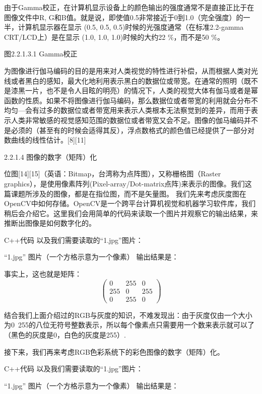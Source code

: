 	由于Gamma校正，在计算机显示设备上的颜色输出的强度通常不是直接正比于在图像文件中R, G和B值。就是说，即使值0.5非常接近于0到1.0（完全强度）的一半，计算机显示器在显示 (0.5, 0.5, 0.5)时候的光强度通常（在标准2.2-gamma CRT/LCD上）是在显示 (1.0, 1.0, 1.0)时候的大约22 \%，而不是50 \%。

图2.2.1.3.1 Gamma校正
	
	为图像进行伽马编码的目的是用来对人类视觉的特性进行补偿，从而根据人类对光线或者黑白的感知，最大化地利用表示黑白的数据位或带宽。在通常的照明（既不是漆黑一片，也不是令人目眩的明亮）的情况下，人类的视觉大体有伽马或者是幂函数的性质。如果不将图像进行伽马编码，那么数据位或者带宽的利用就会分布不均匀---会有过多的数据位或者带宽用来表示人类根本无法察觉到的差异，而用于表示人类非常敏感的视觉感知范围的数据位或者带宽又会不足。图像的伽马编码并不是必须的（甚至有的时候会适得其反），浮点数格式的颜色值已经提供了一部分对数曲线的线性估计。[8][11]

2.2.1.4 图像的数字（矩阵）化

	位图[14][15]（英语：Bitmap，台湾称为点阵图），又称栅格图（Raster graphics），是使用像素阵列(Pixel-array/Dot-matrix点阵)来表示的图像。我们这篇课题所涉及的图像，都是在指位图，而不是矢量图。
	我们先来考虑灰度图在OpenCV中如何存储。OpenCV是一个跨平台计算机视觉和机器学习软件库，我们稍后会介绍它。这里我们会用简单的代码来读取一个图片并观察它的输出结果，来推断出图像是如何数字化的。

C++代码
	以及我们需要读取的“1.jpg”图片：

“1.jpg” 图片（一个方格示意为一个像素）
	输出结果是：




事实上，这也就是矩阵：
$$\begin{pmatrix}0&255&0\\255&0&255\\0&255&0\end{pmatrix}$$

	结合我们上面介绍过的RGB与灰度的知识，不难发现出：由于灰度仅由一个大小为0~255的八位无符号整数表示，所以每个像素点只需要用一个数来表示就可以了（黑色的灰度是0，白色的灰度是255）.

	接下来，我们再来考虑RGB色彩系统下的彩色图像的数字（矩阵）化。








C++代码
	以及我们需要读取的“1.jpg”图片：

“1.jpg” 图片（一个方格示意为一个像素）
	输出结果是：




